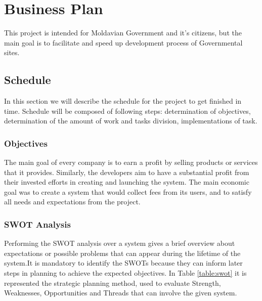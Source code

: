 \section{Business Plan}

This project is intended for Moldavian Government and it's citizens, but the main goal is to facilitate and speed up development process of Governmental sites.

\subsection{Schedule}

In this section we will describe the schedule for the project to get finished in time. Schedule will be composed of following steps: determination of objectives, determination of the amount of work and tasks division, implementations of task. 

\subsubsection{Objectives}

The main goal of every company is to earn a profit by selling products or services that it provides. Similarly, the developers aim to have a substantial profit from their invested efforts in creating and launching the system.  The main economic goal was to create a system that would collect fees from its users, and to satisfy all needs and expectations from the project. 

\subsubsection{SWOT Analysis}
Performing the SWOT analysis over a system gives a brief overview about expectations or possible problems that can appear during the lifetime of the system.It is mandatory to identify the SWOTs because they can inform later steps in planning to achieve the expected objectives. In Table \ref{table:swot}  it is represented the strategic planning method, used to evaluate Strength, Weaknesses, Opportunities and Threads that can involve the given system.

